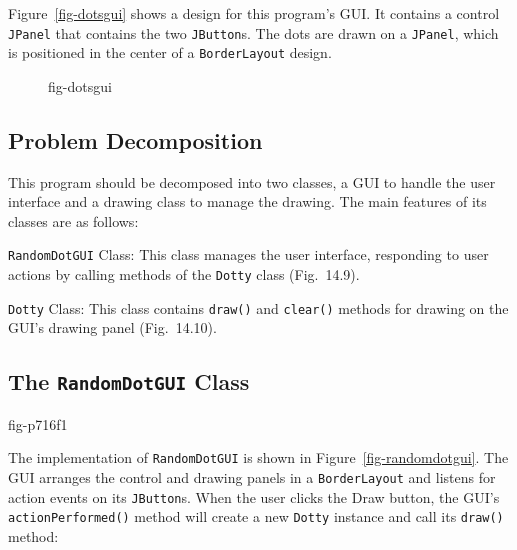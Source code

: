 \pagebreak
Figure~\ref{fig-dotsgui} shows a design for this program's GUI.
It contains a control {\tt JPanel} that contains the two
{\tt JButton}s.  The dots are drawn on a {\tt JPanel}, which is
positioned in the center of a {\tt BorderLayout} design. 

\begin{figure}[tb]
{fig-dotsgui}

\end{figure}

\subsection*{Problem Decomposition}

\noindent This program should be decomposed into two classes, a GUI to handle
the user interface and a drawing class to manage the drawing.
The main features of its classes are as follows:

\begin{BL}
\item  {\tt RandomDotGUI} Class: This class manages the user interface,
responding to user actions by calling methods of the {\tt Dotty} class
(Fig.~14.9).

\item  {\tt Dotty} Class:  This class contains {\tt draw()} and {\tt clear()}
methods for drawing on the GUI's drawing panel (Fig.~14.10).
\end{BL}



\subsection*{The {\tt RandomDotGUI} Class}
{fig-p716f1}

\noindent The implementation of {\tt RandomDotGUI} is shown in
Figure~\ref{fig-randomdotgui}.  The GUI arranges the control and
drawing panels in a {\tt BorderLayout} and listens for action events
on its {\tt JButton}s.  When the user clicks the Draw button, the
GUI's {\tt action\-Per\-formed()} method will create a new {\tt Dotty}
instance and call its {\tt draw()} method:


